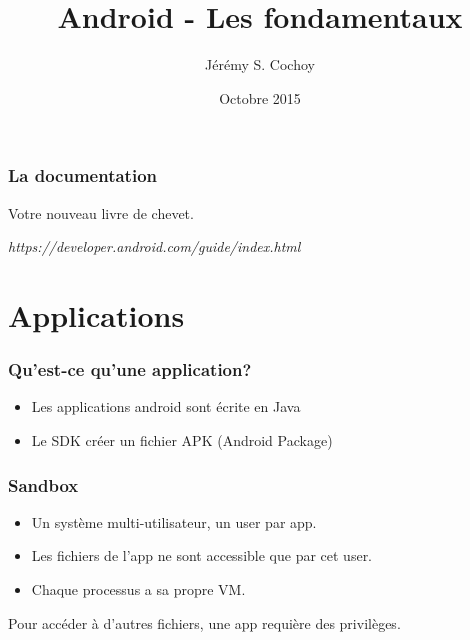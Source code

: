 \documentclass{beamer}
\begin{document}
\title{Android - Les fondamentaux}
\author{Jérémy S. Cochoy}
\date{Octobre 2015}


\begin{frame}
\titlepage
\end{frame}

\begin{frame}
\tableofcontents
\end{frame}

\begin{frame}
\frametitle{La documentation}

\begin{block}{Votre nouveau livre de chevet.}
\begin{center}
\emph{https://developer.android.com/guide/index.html}
\end{center}
\end{block}

\end{frame}

\section{Applications}

\begin{frame}
\frametitle{Qu'est-ce qu'une application?}

\begin{itemize}
	\item Les applications android sont écrite en Java
	\item Le SDK créer un fichier APK (Android Package)
\end{itemize}

\end{frame}


\begin{frame}
\frametitle{Sandbox}

\begin{itemize}
	\item Un système multi-utilisateur, un user par app.
	\item Les fichiers de l'app ne sont accessible que par cet user.
	\item Chaque processus a sa propre VM.
\end{itemize}

Pour accéder à d'autres fichiers, une app requière des privilèges.

\end{frame}
\end{document}
